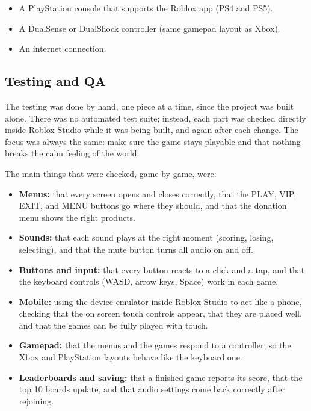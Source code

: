 \documentclass[12pt,letterpaper]{article}
\begin{document}
\begin{itemize}
  \item A PlayStation console that supports the Roblox app (PS4 and PS5).
  \item A DualSense or DualShock controller (same gamepad layout as Xbox).
  \item An internet connection.
\end{itemize}

\subsection{Testing and QA}

The testing was done by hand, one piece at a time, since the project was built alone. There was no automated test suite; instead, each part was checked directly inside Roblox Studio while it was being built, and again after each change. The focus was always the same: make sure the game stays playable and that nothing breaks the calm feeling of the world.

The main things that were checked, game by game, were:

\begin{itemize}
  \item \textbf{Menus:} that every screen opens and closes correctly, that the PLAY, VIP, EXIT, and MENU buttons go where they should, and that the donation menu shows the right products.
  \item \textbf{Sounds:} that each sound plays at the right moment (scoring, losing, selecting), and that the mute button turns all audio on and off.
  \item \textbf{Buttons and input:} that every button reacts to a click and a tap, and that the keyboard controls (WASD, arrow keys, Space) work in each game.
  \item \textbf{Mobile:} using the device emulator inside Roblox Studio to act like a phone, checking that the on screen touch controls appear, that they are placed well, and that the games can be fully played with touch.
  \item \textbf{Gamepad:} that the menus and the games respond to a controller, so the Xbox and PlayStation layouts behave like the keyboard one.
  \item \textbf{Leaderboards and saving:} that a finished game reports its score, that the top 10 boards update, and that audio settings come back correctly after rejoining.
\end{itemize}
\end{document}
